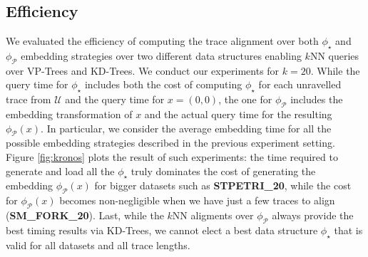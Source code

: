\subsection{Efficiency}\label{subsec:efficio}
We evaluated the efficiency of computing the trace alignment over both $\phi_\star$ and $\phi_{\mathcal{P}}$ embedding strategies over two different data structures enabling $k$NN queries over VP-Trees and KD-Trees. We conduct our experiments for $k=20$. While the query time for $\phi_\star$ includes both the cost of computing $\phi_\star$ for each unravelled trace from $\mathcal{U}$ and the query time for $x=(0,0)$, the one for $\phi_{\mathcal{P}}$ includes the embedding transformation of $x$ and the actual query time for the resulting $\phi_{\mathcal{P}}(x)$. In particular, we consider the average embedding time for all the possible embedding strategies described in the previous experiment setting. Figure \ref{fig:kronos} plots the result of such experiments: the time required to generate and load all the $\phi_\star$ truly dominates the cost of generating the embedding $\phi_{\mathcal{P}}(x)$ for bigger datasets such as \textbf{STPETRI\_20}, while the cost for $\phi_{\mathcal{P}}(x)$ becomes non-negligible when we have just a few traces to align (\textbf{SM\_FORK\_20}). Last, while the $k$NN aligments over $\phi_{\mathcal{P}}$ always provide the best timing results via KD-Trees, we cannot elect a best data structure $\phi_\star$ that is valid for all datasets and all trace lengths.